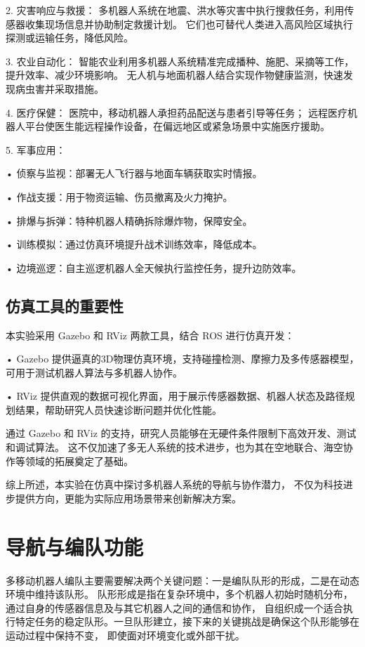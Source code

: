 \documentclass[journal,twoside,web]{ieeecolor}
\begin{document}
2.	灾害响应与救援：
多机器人系统在地震、洪水等灾害中执行搜救任务，利用传感器收集现场信息并协助制定救援计划。
它们也可替代人类进入高风险区域执行探测或运输任务，降低风险。
	
3.	农业自动化：
智能农业利用多机器人系统精准完成播种、施肥、采摘等工作，提升效率、减少环境影响。
无人机与地面机器人结合实现作物健康监测，快速发现病虫害并采取措施。
	
4.	医疗保健：
医院中，移动机器人承担药品配送与患者引导等任务；
远程医疗机器人平台使医生能远程操作设备，在偏远地区或紧急场景中实施医疗援助。
	
5.	军事应用：
	
•	侦察与监视：部署无人飞行器与地面车辆获取实时情报。
	
•	作战支援：用于物资运输、伤员撤离及火力掩护。
	
•	排爆与拆弹：特种机器人精确拆除爆炸物，保障安全。
	
•	训练模拟：通过仿真环境提升战术训练效率，降低成本。
	
•	边境巡逻：自主巡逻机器人全天候执行监控任务，提升边防效率。

\subsection*{仿真工具的重要性}
本实验采用 Gazebo 和 RViz 两款工具，结合 ROS 进行仿真开发：


•	Gazebo 提供逼真的3D物理仿真环境，支持碰撞检测、摩擦力及多传感器模型，可用于测试机器人算法与多机器人协作。

•	RViz 提供直观的数据可视化界面，用于展示传感器数据、机器人状态及路径规划结果，帮助研究人员快速诊断问题并优化性能。

通过 Gazebo 和 RViz 的支持，研究人员能够在无硬件条件限制下高效开发、测试和调试算法。
这不仅加速了多无人系统的技术进步，也为其在空地联合、海空协作等领域的拓展奠定了基础。

综上所述，本实验在仿真中探讨多机器人系统的导航与协作潜力，
不仅为科技进步提供方向，更能为实际应用场景带来创新解决方案。
\section{导航与编队功能}
多移动机器人编队主要需要解决两个关键问题：一是编队队形的形成，二是在动态环境中维持该队形。
队形形成是指在复杂环境中，多个机器人初始时随机分布，通过自身的传感器信息及与其它机器人之间的通信和协作，
自组织成一个适合执行特定任务的稳定队形。一旦队形建立，接下来的关键挑战是确保这个队形能够在运动过程中保持不变，
即使面对环境变化或外部干扰。
\end{document}
